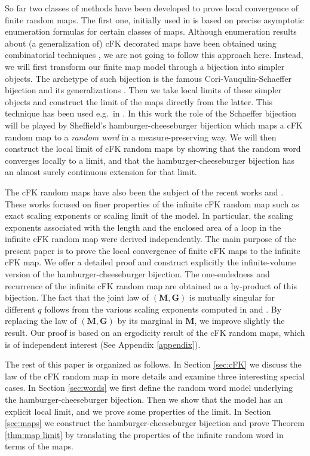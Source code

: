 \documentclass[a4paper]{article}
\newcommand*{\map}{\mathbf}
\begin{document}
So far two classes of methods have been developed to prove local convergence of finite random maps. The first one, initially used in \cite{AS03} is based on precise asymptotic enumeration formulas for certain classes of maps. Although enumeration results about (a generalization of) cFK decorated maps have been obtained using combinatorial techniques \cite{Kos89,EK95,BB11,GJSZ12,BBG12a,BBG12b,BBG12c}, we are not going to follow this approach here.
Instead, we will first transform our finite map model through a bijection into simpler objects. The archetype of such bijection is the famous Cori-Vauqulin-Schaeffer bijection and its generalizations \cite{Sch98,BDG04}.
Then we take local limits of these simpler objects and construct the limit of the maps directly from the latter.
This technique has been used e.g.~in \cite{CD06,CMM13,BS14}.
In this work the role of the Schaeffer bijection will be played by Sheffield's hamburger-cheeseburger bijection \cite{She11} which maps a cFK random map to a \emph{random word} in a measure-preserving way. We will then construct the local limit of cFK random maps by showing that the random word converges locally to a limit, and that the hamburger-cheeseburger bijection has an almost surely continuous extension for that limit.

The cFK random maps have also been the subject of the recent works \cite{BLR15} and \cite{GMS15,GS15a,GS15b}.
These works focused on finer properties of the infinite cFK random map such as exact scaling exponents or scaling limit of the model.
In particular, the scaling exponents associated with the length and the enclosed area of a loop in the infinite cFK random map were derived independently.
The main purpose of the present paper is to prove the local convergence of finite cFK maps to the infinite cFK map.
We offer a detailed proof and construct explicitly the infinite-volume version of the hamburger-cheeseburger bijection.
The one-endedness and recurrence of the infinite cFK random map are obtained as a by-product of this bijection.
The fact that the joint law of $(\map{M,G})$ is mutually singular for different $q$ follows from the various scaling exponents computed in \cite{BLR15} and \cite{GMS15}.
By replacing the law of $(\map{M,G})$ by its marginal in $\map{M}$, we improve slightly the result.
Our proof is based on an ergodicity result of the cFK random maps, which is of independent interest (See Appendix \ref{appendix}).

The rest of this paper is organized as follows.
In Section \ref{sec:cFK} we discuss the law of the cFK random map in more details and examine three interesting special cases. In Section \ref{sec:words} we first define the random word model underlying the hamburger-cheeseburger bijection. Then we show that the model has an explicit local limit, and we prove some properties of the limit. In Section \ref{sec:maps} we construct the hamburger-cheeseburger bijection and prove Theorem \ref{thm:map limit} by translating the properties of the infinite random word in terms of the maps.
\end{document}
